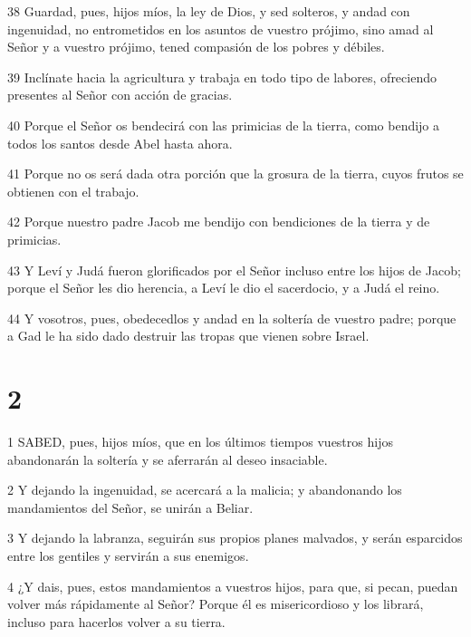 \par 38 Guardad, pues, hijos míos, la ley de Dios, y sed solteros, y andad con ingenuidad, no entrometidos en los asuntos de vuestro prójimo, sino amad al Señor y a vuestro prójimo, tened compasión de los pobres y débiles.

\par 39 Inclínate hacia la agricultura y trabaja en todo tipo de labores, ofreciendo presentes al Señor con acción de gracias.

\par 40 Porque el Señor os bendecirá con las primicias de la tierra, como bendijo a todos los santos desde Abel hasta ahora.

\par 41 Porque no os será dada otra porción que la grosura de la tierra, cuyos frutos se obtienen con el trabajo.

\par 42 Porque nuestro padre Jacob me bendijo con bendiciones de la tierra y de primicias.

\par 43 Y Leví y Judá fueron glorificados por el Señor incluso entre los hijos de Jacob; porque el Señor les dio herencia, a Leví le dio el sacerdocio, y a Judá el reino.

\par 44 Y vosotros, pues, obedecedlos y andad en la soltería de vuestro padre; porque a Gad le ha sido dado destruir las tropas que vienen sobre Israel.

\chapter{2}

\par 1 SABED, pues, hijos míos, que en los últimos tiempos vuestros hijos abandonarán la soltería y se aferrarán al deseo insaciable.

\par 2 Y dejando la ingenuidad, se acercará a la malicia; y abandonando los mandamientos del Señor, se unirán a Beliar.

\par 3 Y dejando la labranza, seguirán sus propios planes malvados, y serán esparcidos entre los gentiles y servirán a sus enemigos.

\par 4 ¿Y dais, pues, estos mandamientos a vuestros hijos, para que, si pecan, puedan volver más rápidamente al Señor? Porque él es misericordioso y los librará, incluso para hacerlos volver a su tierra.

